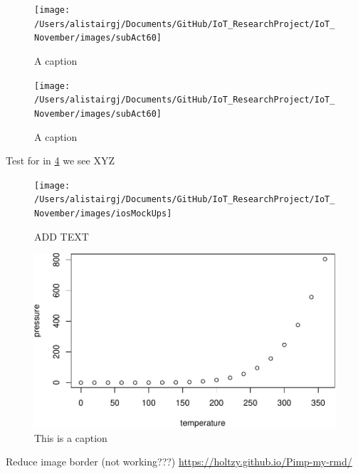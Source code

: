 \documentclass[11pt,]{article}
\newenvironment{Shaded}{\begin{snugshade}}{\end{snugshade}}
\newcommand{\NormalTok}[1]{\textcolor[rgb]{0.12,0.11,0.11}{#1}}
\newcommand{\OperatorTok}[1]{\textcolor[rgb]{0.12,0.11,0.11}{#1}}
\begin{document}
\begin{figure}[H]
\texttt{[image: /Users/alistairgj/Documents/GitHub/IoT\_ResearchProject/IoT\_November/images/subAct60]} \caption{A caption}\label{fig:pressure}
\end{figure}

\begin{figure}[H]
\texttt{[image: /Users/alistairgj/Documents/GitHub/IoT\_ResearchProject/IoT\_November/images/subAct60]} \caption{A caption}\label{fig:pressureFULL}
\end{figure}

\begin{Shaded}
\begin{Highlighting}[]
\OperatorTok{%
\end{Highlighting}
\end{Shaded}

Test for in \ref{fig:fig1} we see XYZ

\begin{figure}[H]

{\centering \texttt{[image: /Users/alistairgj/Documents/GitHub/IoT\_ResearchProject/IoT\_November/images/iosMockUps]} 

}

\caption{ADD TEXT}\label{fig:unnamed-chunk-19}
\end{figure}

\begin{figure}
\centering
\includegraphics{MD_Final_files/figure-latex/fig1-1.pdf}
\caption{\label{fig:fig1}This is a caption}
\end{figure}

Reduce image border (not working???)
\url{https://holtzy.github.io/Pimp-my-rmd/}
\end{document}
